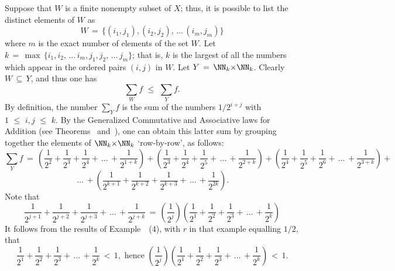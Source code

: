         Suppose that $W$ is a finite nonempty subset of $X$; thus, it is possible to list the distinct elements of $W$ as
        \begin{displaymath}
        W \,=\, \{(i_{1},j_{1}), (i_{2},j_{2}),\,{\ldots}\,(i_{m},j_{m})\}
        \end{displaymath}
    where $m$ is the exact number of elements of the set $W$.
    Let $k \,=\, \max\,\{i_{1},i_{2},\,{\ldots}\,i_{m},j_{1},j_{2},\,{\ldots}\,j_{m}\}$;
    that is, $k$ is the largest of all the numbers which appear in the ordered pairs $(i,j)$ in $W$.
    Let $Y \,=\, {\NN}_{k}{\times}{\NN}_{k}$.
    Clearly $W \,{\subseteq}\, Y$, and thus one has
        \begin{displaymath}
        {\sum}_{W} f\,\,{\leq}\,\,{\sum}_{Y} f.
        \end{displaymath}
    By definition, the number ${\sum}_{Y} f$ is the sum of the numbers $1/2^{i+j}$ with $1\,\,{\leq}\,\,i,j\,\,{\leq}\,\,k$.
    By the Generalized Commutative and Associative laws for Addition (see Theorems~ and~),
    one can obtain this latter sum by grouping together the elements of ${\NN}_{k}{\times}{\NN}_{k}$ `row-by-row', as follows:
        \begin{displaymath}
        {\sum}_{Y} f \,=\, \left(\frac{1}{2^{2}}+\frac{1}{2^{3}} + \frac{1}{2^{4}} + \,{\ldots}\,+\frac{1}{2^{1+k}}\right) +
    \left(\frac{1}{2^{3}}+\frac{1}{2^{4}} + \frac{1}{2^{5}} + \,{\ldots}\,+\frac{1}{2^{2+k}}\right) +
    \left(\frac{1}{2^{4}}+\frac{1}{2^{5}} + \frac{1}{2^{6}} + \,{\ldots}\,+\frac{1}{2^{3+k}}\right) +
        \end{displaymath}
        \begin{displaymath}
\,{\ldots}\, + \left(\frac{1}{2^{k+1}}+\frac{1}{2^{k+2}} + \frac{1}{2^{k+3}} + \,{\ldots}\,+\frac{1}{2^{2k}}\right).
        \end{displaymath}
    Note that
        \begin{displaymath}
        \frac{1}{2^{j+1}}+\frac{1}{2^{j+2}} + \frac{1}{2^{j+3}} + \,{\ldots}\,+\frac{1}{2^{j+k}} \,=\, \left(\frac{1}{2^{j}}\right)\left(\frac{1}{2^{1}}+\frac{1}{2^{2}} + \frac{1}{2^{3}} + \,{\ldots}\,+\frac{1}{2^{k}}\right)
        \end{displaymath}
    It follows from the results of Example~~(4), with $r$ in that example equalling $1/2$, that
        \begin{displaymath}
        \frac{1}{2^{1}}+\frac{1}{2^{2}} + \frac{1}{2^{3}} + \,{\ldots}\,+\frac{1}{2^{k}}\,<\,1, \mbox{ hence } \left(\frac{1}{2^{j}}\right)\left(\frac{1}{2^{1}}+\frac{1}{2^{2}} + \frac{1}{2^{3}} + \,{\ldots}\,+\frac{1}{2^{k}}\right)\,<\,1.
        \end{displaymath}
